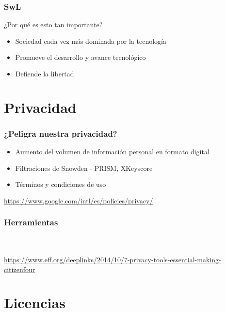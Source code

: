 \documentclass{beamer}
\begin{document}
\begin{frame}\frametitle{SwL}
    \begin{block}{¿Por qué es esto tan importante?} \pause
        \begin{itemize}
                \item Sociedad cada vez más dominada por la tecnología \pause
                \item Promueve el desarrollo y avance tecnológico \pause
                \item Defiende la libertad
        \end{itemize}
    \end{block}
\end{frame}

\section{Privacidad}

\begin{frame}
\end{frame}

\begin{frame}\frametitle{¿Peligra nuestra privacidad?} \pause
	\begin{itemize}
        \item Aumento del volumen de información personal en formato digital \pause
		\item Filtraciones de Snowden - PRISM, XKeyscore \pause
		\item Términos y condiciones de uso
	\end{itemize}

	        \url{https://www.google.com/intl/es/policies/privacy/}
\end{frame}

\begin{frame}\frametitle{Herramientas}

    \\~\\
    \url{https://www.eff.org/deeplinks/2014/10/7-privacy-tools-essential-making-citizenfour}
\end{frame}


\section{Licencias}
\end{document}
